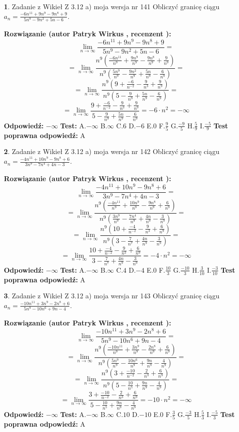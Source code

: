 \documentclass[12pt, a4paper]{article}
\theoremstyle{definition} %
\newtheorem{zad}{}
\newcommand{\zadStart}[1]{\begin{zad}#1\newline}
\newcommand{\zadStop}{\end{zad}}
\newcommand{\rozwStart}[2]{\noindent \textbf{Rozwiązanie (autor #1 , recenzent #2): }\newline}
\newcommand{\rozwStop}{\newline}
\newcommand{\odpStart}{\noindent \textbf{Odpowiedź:}\newline}
\newcommand{\odpStop}{\newline}
\newcommand{\testStart}{\noindent \textbf{Test:}\newline}
\newcommand{\testStop}{\newline}
\newcommand{\kluczStart}{\noindent \textbf{Test poprawna odpowiedź:}\newline}
\newcommand{\kluczStop}{\newline}
\begin{document}
\zadStart{Zadanie z Wikieł Z 3.12 a) moja wersja nr 141}
Obliczyć granicę ciągu $a_{n}=\frac{-6n^{11}+9n^{9}-9n^{8}+9}{5n^{9}-9n^{2}+5n-6}$.
\zadStop
\rozwStart{Patryk Wirkus}{}
$$\lim\limits_{n\to\infty}\frac{-6n^{11}+9n^{9}-9n^{8}+9}{5n^{9}-9n^{2}+5n-6}=$$
$$=\lim\limits_{n\to\infty}\frac{n^{9}\left(\frac{-6n^{11}}{n^{9}}+\frac{9n^{9}}{n^{9}}-\frac{9n^{8}}{n^{9}}+\frac{9}{n^{9}}\right)}{n^{9}\left(\frac{5n^{9}}{n^{9}}-\frac{9n^{2}}{n^{9}}+\frac{5n}{n^{9}}-\frac{6}{n^{9}}\right)}=$$
$$=\lim\limits_{n\to\infty}\frac{n^{9}\left(9+\frac{-6}{n^{-2}}-\frac{9}{n^{3}}+\frac{9}{n^{9}}\right)}
{n^{9}\left(5-\frac{9}{n^{9}}+\frac{5n}{n^{9}}-\frac{6}{n^{9}}\right)}=$$
$$=\lim\limits_{n\to\infty}\frac{9+\frac{-6}{n^{-2}}-\frac{9}{n^{3}}+\frac{9}{n^{9}}}{5-\frac{9}{n^{9}}+\frac{5n}{n^{9}}-\frac{6}{n^{9}}}=-6\cdot n^{2} = -\infty$$
\rozwStop
\odpStart
$-\infty$
\odpStop
\testStart
A.$-\infty$
B.$\infty$
C.$6$
D.$-6$
E.$0$
F.$\frac{9}{5}$
G.$\frac{-9}{5}$
H.$\frac{5}{9}$
I.$\frac{-5}{9}$
\testStop
\kluczStart
A
\kluczStop



\zadStart{Zadanie z Wikieł Z 3.12 a) moja wersja nr 142}
Obliczyć granicę ciągu $a_{n}=\frac{-4n^{11}+10n^{9}-9n^{8}+6}{3n^{9}-7n^{4}+4n-3}$.
\zadStop
\rozwStart{Patryk Wirkus}{}
$$\lim\limits_{n\to\infty}\frac{-4n^{11}+10n^{9}-9n^{8}+6}{3n^{9}-7n^{4}+4n-3}=$$
$$=\lim\limits_{n\to\infty}\frac{n^{9}\left(\frac{-4n^{11}}{n^{9}}+\frac{10n^{9}}{n^{9}}-\frac{9n^{8}}{n^{9}}+\frac{6}{n^{9}}\right)}{n^{9}\left(\frac{3n^{9}}{n^{9}}-\frac{7n^{4}}{n^{9}}+\frac{4n}{n^{9}}-\frac{3}{n^{9}}\right)}=$$
$$=\lim\limits_{n\to\infty}\frac{n^{9}\left(10+\frac{-4}{n^{-2}}-\frac{9}{n^{3}}+\frac{6}{n^{9}}\right)}
{n^{9}\left(3-\frac{7}{n^{7}}+\frac{4n}{n^{9}}-\frac{3}{n^{9}}\right)}=$$
$$=\lim\limits_{n\to\infty}\frac{10+\frac{-4}{n^{-2}}-\frac{9}{n^{3}}+\frac{6}{n^{9}}}{3-\frac{7}{n^{7}}+\frac{4n}{n^{9}}-\frac{3}{n^{9}}}=-4\cdot n^{2} = -\infty$$
\rozwStop
\odpStart
$-\infty$
\odpStop
\testStart
A.$-\infty$
B.$\infty$
C.$4$
D.$-4$
E.$0$
F.$\frac{10}{3}$
G.$\frac{-10}{3}$
H.$\frac{3}{10}$
I.$\frac{-3}{10}$
\testStop
\kluczStart
A
\kluczStop



\zadStart{Zadanie z Wikieł Z 3.12 a) moja wersja nr 143}
Obliczyć granicę ciągu $a_{n}=\frac{-10n^{11}+3n^{9}-2n^{8}+6}{5n^{9}-10n^{6}+9n-4}$.
\zadStop
\rozwStart{Patryk Wirkus}{}
$$\lim\limits_{n\to\infty}\frac{-10n^{11}+3n^{9}-2n^{8}+6}{5n^{9}-10n^{6}+9n-4}=$$
$$=\lim\limits_{n\to\infty}\frac{n^{9}\left(\frac{-10n^{11}}{n^{9}}+\frac{3n^{9}}{n^{9}}-\frac{2n^{8}}{n^{9}}+\frac{6}{n^{9}}\right)}{n^{9}\left(\frac{5n^{9}}{n^{9}}-\frac{10n^{6}}{n^{9}}+\frac{9n}{n^{9}}-\frac{4}{n^{9}}\right)}=$$
$$=\lim\limits_{n\to\infty}\frac{n^{9}\left(3+\frac{-10}{n^{-2}}-\frac{2}{n^{3}}+\frac{6}{n^{9}}\right)}
{n^{9}\left(5-\frac{10}{n^{5}}+\frac{9n}{n^{9}}-\frac{4}{n^{9}}\right)}=$$
$$=\lim\limits_{n\to\infty}\frac{3+\frac{-10}{n^{-2}}-\frac{2}{n^{3}}+\frac{6}{n^{9}}}{5-\frac{10}{n^{5}}+\frac{9n}{n^{9}}-\frac{4}{n^{9}}}=-10\cdot n^{2} = -\infty$$
\rozwStop
\odpStart
$-\infty$
\odpStop
\testStart
A.$-\infty$
B.$\infty$
C.$10$
D.$-10$
E.$0$
F.$\frac{3}{5}$
G.$\frac{-3}{5}$
H.$\frac{5}{3}$
I.$\frac{-5}{3}$
\testStop
\kluczStart
A
\kluczStop
\end{document}
